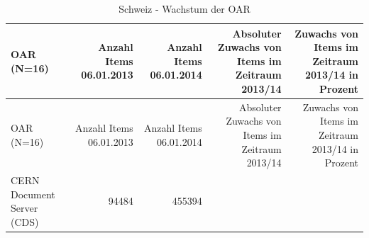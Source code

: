 \documentclass[a4paper,
fontsize=11pt,
oneside,
numbers=noperiodatend,
parskip=half-,
bibliography=totoc,
final
]{scrartcl}
\begin{document}
\begin{longtable}[c]{@{}lrrrr@{}}
\caption{Schweiz - Wachstum der OAR}\tabularnewline
\toprule
\begin{minipage}[b]{0.25\columnwidth}\raggedright\strut
OAR (N=16)
\strut\end{minipage} &
\begin{minipage}[b]{0.16\columnwidth}\raggedleft\strut
Anzahl Items 06.01.2013
\strut\end{minipage} &
\begin{minipage}[b]{0.16\columnwidth}\raggedleft\strut
Anzahl Items 06.01.2014
\strut\end{minipage} &
\begin{minipage}[b]{0.14\columnwidth}\raggedleft\strut
Absoluter Zuwachs von Items im Zeitraum 2013/14
\strut\end{minipage} &
\begin{minipage}[b]{0.14\columnwidth}\raggedleft\strut
Zuwachs von Items im Zeitraum 2013/14 in Prozent
\strut\end{minipage}\tabularnewline
\midrule
\endfirsthead
\toprule
\begin{minipage}[b]{0.25\columnwidth}\raggedright\strut
OAR (N=16)
\strut\end{minipage} &
\begin{minipage}[b]{0.16\columnwidth}\raggedleft\strut
Anzahl Items 06.01.2013
\strut\end{minipage} &
\begin{minipage}[b]{0.16\columnwidth}\raggedleft\strut
Anzahl Items 06.01.2014
\strut\end{minipage} &
\begin{minipage}[b]{0.14\columnwidth}\raggedleft\strut
Absoluter Zuwachs von Items im Zeitraum 2013/14
\strut\end{minipage} &
\begin{minipage}[b]{0.14\columnwidth}\raggedleft\strut
Zuwachs von Items im Zeitraum 2013/14 in Prozent
\strut\end{minipage}\tabularnewline
\midrule
\endhead
\begin{minipage}[t]{0.25\columnwidth}\raggedright\strut
CERN Document Server (CDS)
\strut\end{minipage} &
\begin{minipage}[t]{0.16\columnwidth}\raggedleft\strut
94484
\strut\end{minipage} &
\begin{minipage}[t]{0.16\columnwidth}\raggedleft\strut
455394
\strut\end{minipage} &

\end{longtable}
\end{document}

